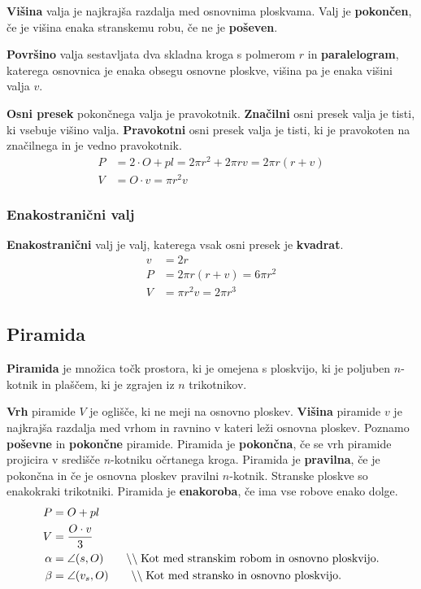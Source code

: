 \documentclass[a4paper,oneside,12pt,fleqn]{article}
\newcommand\krat\cdot
\newcommand{\comment}[1]{\ensuremath{\qquad\backslash\backslash\;}\textnormal{#1}}
\numberwithin{equation}{section}
\begin{document}
\textbf{Višina} valja je najkrajša razdalja med osnovnima ploskvama. Valj je
\textbf{pokončen}, če je višina
enaka stranskemu robu, če ne je \textbf{poševen}.

\textbf{Površino} valja sestavljata dva skladna kroga s polmerom $r$ in
\textbf{paralelogram}, katerega
osnovnica je enaka obsegu osnovne ploskve, višina pa je enaka višini valja $v$.

\textbf{Osni presek} pokončnega valja je pravokotnik. \textbf{Značilni} osni presek valja je tisti, ki
vsebuje višino valja. \textbf{Pravokotni} osni presek valja je tisti, ki je pravokoten na
značilnega in je vedno pravokotnik.
\begin{align*}
  P &= 2 \krat O + pl = 2\pi r^2 + 2\pi rv = 2\pi r(r+v) \\
  V &= O \krat v = \pi r^2v
\end{align*}

\subsubsection{Enakostranični valj}
\label{sec:tel:valj:enak}
\textbf{Enakostranični} valj je valj, katerega vsak osni presek je \textbf{kvadrat}.
\begin{align*}
  v &= 2r \\
  P &= 2\pi r(r+v) = 6\pi r^2 \\
  V &= \pi r^2v = 2\pi r^3
\end{align*}

\subsection{Piramida}
\label{sec:tel:pir}
\textbf{Piramida} je množica točk prostora, ki je omejena s ploskvijo, ki je poljuben $n$-kotnik in plaščem, ki
je zgrajen iz $n$ trikotnikov.

\textbf{Vrh} piramide $V$ je oglišče, ki ne meji na osnovno ploskev. \textbf{Višina}
piramide $v$ je najkrajša razdalja med 
vrhom in ravnino v kateri leži osnovna ploskev. Poznamo \textbf{poševne} in
\textbf{pokončne} piramide. Piramida je \textbf{pokončna}, 
če se vrh piramide projicira v središče $n$-kotniku očrtanega kroga. Piramida je
\textbf{pravilna}, če je pokončna in če je osnovna ploskev pravilni $n$-kotnik. 
Stranske ploskve so enakokraki trikotniki. Piramida je \textbf{enakoroba}, če ima 
vse robove enako dolge.
\begin{align*}
  P &= O + pl \\
  V &= \frac{O \krat v}{3} \\
  \alpha &= \angle(s,O) \comment{Kot med stranskim robom in osnovno ploskvijo.} \\
  \beta &= \angle(v_s,O) \comment{Kot med stransko in osnovno ploskvijo.}
\end{align*}
\end{document}
